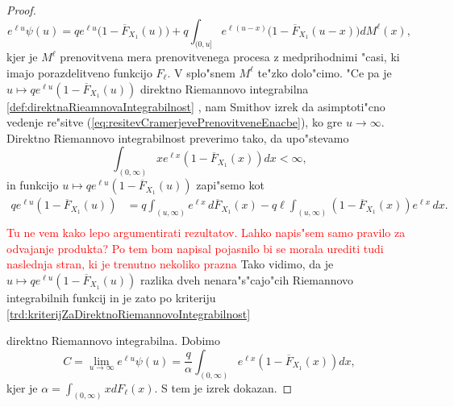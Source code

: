 \documentclass[12pt, a4paper, reqno]{amsart}
\theoremstyle{definition}
\theoremstyle{plain}
\newcommand{\1}{\mathds{1}}
\newcommand*{\refPriloga}[1]{%
  \begingroup
    \hypersetup{
      linkcolor=properpurple,
      linkbordercolor=properpurple,
    }%
    \ref{#1}%
  \endgroup
}
\begin{document}
\begin{proof}
                \begin{equation}
                    e^{\ell u}\psi(u) =qe^{\ell u}\bigl(1 - \overline{F}_{X_1}(u)\bigr) +  q\int_{(0, u]}e^{\ell(u - x)}\bigl(1 - \overline{F}_{X_1}(u - x)\bigr)dM^{\ell}(x),
                    \label{eq:resitevCramerjevePrenovitveneEnacbe}
                \end{equation}
                kjer je $M^{\ell}$ prenovitvena mera prenovitvenega procesa z medprihodnimi "casi, 
                ki imajo porazdelitveno funkcijo $F_\ell$. V splo"snem $M^{\ell}$ te"zko dolo"cimo. 
                "Ce pa je $u\mapsto qe^{\ell u}(1 - \overline{F}_{X_1}(u))$ direktno Riemannovo integrabilna
                \refPriloga{def:direktnaRieamnovaIntegrabilnost}, nam 
                Smithov izrek da asimptoti"cno vedenje re"sitve (\ref{eq:resitevCramerjevePrenovitveneEnacbe}),
                ko gre $u\to\infty$.
                Direktno Riemannovo integrabilnost preverimo tako, da upo"stevamo 
                \begin{equation*}
                    \int_{(0, \infty)}xe^{\ell x}(1 - \overline{F}_{X_1}(x))dx < \infty, 
                \end{equation*}
                in funkcijo $u\mapsto qe^{\ell u}(1 - \overline{F}_{X_1}(u))$ zapi"semo kot
                \begin{align*}
                    qe^{\ell u}(1 - \overline{F}_{X_1}(u))
                     &= q\int_{(u, \infty)}e^{\ell x}\, d\overline{F}_{X_1}(x) 
                        - q\ell \int_{(u, \infty)}(1 - \overline{F}_{X_1}(x))e^{\ell x}\, dx. \\                                  
                \end{align*}
                \textcolor{red}{Tu ne vem kako lepo argumentirati rezultatov. Lahko napis"sem samo pravilo za odvajanje produkta? Po tem bom napisal pojasnilo bi se morala urediti tudi naslednja stran, ki je trenutno nekoliko prazna}
                Tako vidimo, da je $u\mapsto qe^{\ell u}(1 - \overline{F}_{X_1}(u))$ razlika dveh nenara"s"cajo"cih
                Riemannovo integrabilnih funkcij in je zato po kriteriju \refPriloga{trd:kriterijZaDirektnoRiemannovoIntegrabilnost} 
                direktno Riemannovo integrabilna. Dobimo 
                \begin{equation}
                    C = \lim_{u\to\infty}e^{\ell u}\psi(u) =  \frac{q}{\alpha} \int_{(0, \infty)}e^{\ell x}(1 - \overline{F}_{X_1}(x))dx,
                    \label{eq:CramerBoundConstant}
                \end{equation}
                kjer je $\alpha = \int_{(0, \infty)}x dF_\ell(x)$. S tem je izrek dokazan.
            \end{proof}
\end{document}
